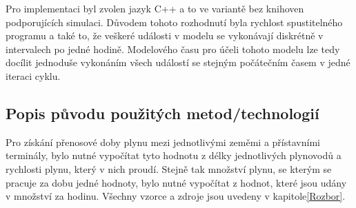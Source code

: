 \documentclass[a4paper,11pt]{article}
\begin{document}

Pro implementaci byl zvolen jazyk C++ a to ve variantě bez knihoven podporujících simulaci.
Důvodem tohoto rozhodnutí byla rychlost spustitelného programu a také to,
že veškeré události v modelu se vykonávají diskrétně v intervalech po jedné hodině.
Modelového času \cite[str,21]{IMS} pro účeli tohoto modelu lze tedy docílit
jednoduše vykonáním všech
událostí se stejným počátečním časem v jedné iteraci cyklu.

\subsection{Popis původu použitých metod/technologií}


Pro získání přenosové doby plynu mezi jednotlivými zeměmi a přístavními terminály,
bylo nutné vypočítat tyto hodnotu z délky jednotlivých plynovodů a rychlosti plynu,
který v nich proudí.
Stejně tak množství plynu, se kterým se pracuje za dobu jedné hodnoty,
bylo nutné vypočítat z hodnot, které jsou udány v množství za hodinu.
Všechny vzorce a zdroje jsou uvedeny v kapitole\ref{Rozbor}. 
\end{document}

